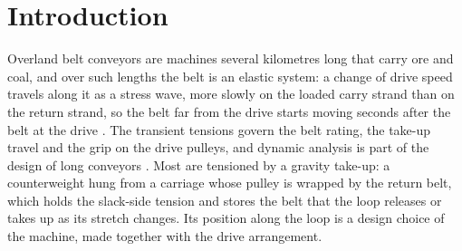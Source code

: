 \section{Introduction}\label{sec:intro}

Overland belt conveyors are machines several kilometres long that carry ore and coal, and over
such lengths the belt is an elastic system: a change of drive speed travels along it as a stress wave, more
slowly on the loaded carry strand than on the return strand, so the belt far from the drive
starts moving seconds after the belt at the drive \citep{harrison1983,nordell1984,lodewijks2002}.
The transient tensions govern the belt rating, the take-up travel and the grip on the drive
pulleys, and dynamic analysis is part of the design of long conveyors
\citep{lodewijks2002,nordell1997zisco}. Most are tensioned by a gravity take-up: a counterweight
hung from a carriage whose pulley is wrapped by the return belt, which holds the slack-side
tension and stores the belt that the loop releases or takes up as its stretch changes. Its
position along the loop is a design choice of the machine, made together with the drive
arrangement.

